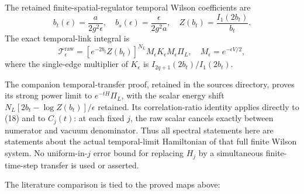 \documentclass[
  11pt,
]{article}
\begin{document}
The retained finite-spatial-regulator temporal Wilson coefficients are
\[
 b_t(\epsilon)=\frac{a}{2g^2\epsilon},\quad
 b_s(\epsilon)=\frac{\epsilon}{2g^2a},\quad
 Z(b_t)=\frac{I_1(2b_t)}{b_t}.
\] The exact temporal-link integral is \[
 \mathcal T_\epsilon^{\mathrm{raw}}
 =[e^{-2b_t}Z(b_t)]^{N_L}
 M_\epsilon K_\epsilon M_\epsilon\Pi_L,
 \quad M_\epsilon=e^{-\epsilon V/2},
\] where the single-edge multiplier of \(K_\epsilon\) is
\(I_{2q+1}(2b_t)/I_1(2b_t)\).

The companion temporal-transfer proof, retained in the sources
directory, proves its strong power limit to \(e^{-tH}\Pi_L\), with the
scalar energy shift \(N_L[2b_t-\log Z(b_t)]/\epsilon\) retained. Its
correlation-ratio identity applies directly to (18) and to \(C_j(t)\):
at each fixed \(j\), the raw scalar cancels exactly between numerator
and vacuum denominator. Thus all spectral statements here are statements
about the actual temporal-limit Hamiltonian of that full finite Wilson
system. No uniform-in-\(j\) error bound for replacing \(H_j\) by a
simultaneous finite-time-step transfer is used or asserted.

The literature comparison is tied to the proved maps above:
\end{document}
